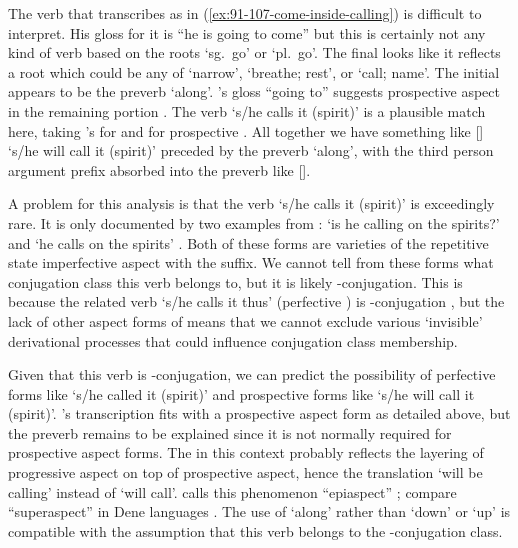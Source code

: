 The verb that \citeauthor{swanton:1909} transcribes as  in (\ref{ex:91-107-come-inside-calling}) is difficult to interpret.
His gloss for it is  “he is going to come” but this is certainly not any kind of verb based on the roots  ‘sg.\ go’ or  ‘pl.\ go’.
The final  looks like it reflects a root  which could be any of  ‘narrow’,  ‘breathe; rest’, or  ‘call; name’.
The initial  appears to be the preverb  ‘along’.
\citeauthor{swanton:1909}’s gloss “going to” suggests prospective aspect in the remaining portion .
The verb  ‘s/he calls it (spirit)’ is a plausible match here, taking \citeauthor{swanton:1909}’s  for  and  for prospective .
All together we have something like  [] ‘s/he will call it (spirit)’ preceded by the preverb  ‘along’, with the third person argument prefix  absorbed into the preverb like [].

A problem for this analysis is that the verb  ‘s/he calls it (spirit)’ is exceedingly rare.
It is only documented by two examples from \citeauthor{story-naish:1973}:  ‘is he calling on the spirits?’ and  ‘he calls on the spirits’ \parencite[40.395–396]{story-naish:1973}.
Both of these forms are varieties of the repetitive state imperfective aspect with the  suffix.
We cannot tell from these forms what conjugation class this verb belongs to, but it is likely -conjugation.
This is because the related verb  ‘s/he calls it thus’ (perfective ) is -conjugation \parencites[09/8]{leer:1973}[487]{leer:1976}, but the lack of other aspect forms of  means that we cannot exclude various ‘invisible’ derivational processes that could influence conjugation class membership.

Given that this verb is -conjugation, we can predict the possibility of perfective forms like  ‘s/he called it (spirit)’ and prospective forms like  ‘s/he will call it (spirit)’.
\citeauthor{swanton:1909}’s transcription  fits with a prospective aspect form as detailed above, but the  preverb remains to be explained since it is not normally required for prospective aspect forms.
The  in this context probably reflects the layering of progressive aspect on top of prospective aspect, hence the translation ‘will be calling’ instead of ‘will call’.
\citeauthor{leer:1991} calls this phenomenon “epiaspect” \parencite[216–217]{leer:1991}; compare “superaspect” in Dene languages \parencites{kari:1979}[118, 130]{kari:1992}[88ff.]{axelrod:1993}.
The use of  ‘along’ rather than  ‘down’ or  ‘up’ is compatible with the assumption that this verb belongs to the -conjugation class.

